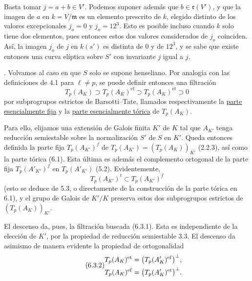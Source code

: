 
Basta tomar $j=a+b\in V'$. Podemos suponer además que
$b\in\mathfrak r(V')$, y que la imagen de $a$ en $k=V/\mathfrak m$ es
un elemento prescrito de $k$, elegido distinto de los valores
excepcionales $j_o=0$ y $j_o=12^3$. Esto es posible incluso cuando $k$
solo tiene dos elementos, pues entonces estos dos valores considerados
de $j_o$ coinciden. Así, la imagen $j_o$ de $j$ en $k(s')$ es distinta
de $0$ y de $12^3$, y se sabe que existe entonces una curva elíptica
sobre $S'$ con invariante $j$ igual a $j$.

\medskip
{}. Volvamos al caso en que $S$ solo se supone henseliano. Por analogía
con las definiciones de 4.1 para $\ell\neq p$, se puede definir entonces
una filtración
\begin{equation}\tag{6.3.1}
 T_p(A_K)\supset T_p(A_K)^{\mathrm{ef}}
 \supset T_p(A_K)^{\mathrm{et}}\supset0
\end{equation}
por subprogrupos estrictos de Barsotti--Tate, llamados respectivamente
la \underline{parte esencialmente fija} y la
\underline{parte esencialmente tórica} de $T_p(A_K)$.

Para ello, elijamos una extensión de Galois finita $K'$ de $K$ tal que
$A_{K'}$ tenga reducción semiestable sobre la normalización $S'$ de $S$
en $K'$. Queda entonces definida la parte fija $T_p(A_{K'})^f$ de
$T_p(A_{K'})=(T_p(A_K))_{K'}$ (2.2.3), así como la parte tórica (6.1).
Esta última es además el complemento ortogonal de la parte fija
$T_p(A'_{K'})^f$ en $T_p(A'_{K'})$ (5.2). Evidentemente,
\[
 T_p(A_{K'})^t\subset T_p(A_{K'})^f
\]
(esto se deduce de 5.3, o directamente de la construcción de la parte
tórica en 6.1), y el grupo de Galois de $K'/K$ preserva estos dos
subprogrupos estrictos de $(T_p(A_K))_{K'}$.


El descenso da, pues, la filtración buscada (6.3.1). Esta es
independiente de la elección de $K'$, por la propiedad de reducción
semiestable 3.3. El descenso da asimismo de manera evidente la propiedad
de ortogonalidad
\begin{equation}\tag{6.3.2}
 \begin{split}
 T_p(A_K)^{\mathrm{et}}
   &=\bigl(T_p(\sisi{A'_k}{A'_K})^{\mathrm{ef}}\bigr)^\perp,\\
 T_p(A_K)^{\mathrm{ef}}
   &=\bigl(T_p(\sisi{A'_k}{A'_K})^{\mathrm{et}}\bigr)^\perp.
 \end{split}
\end{equation}

